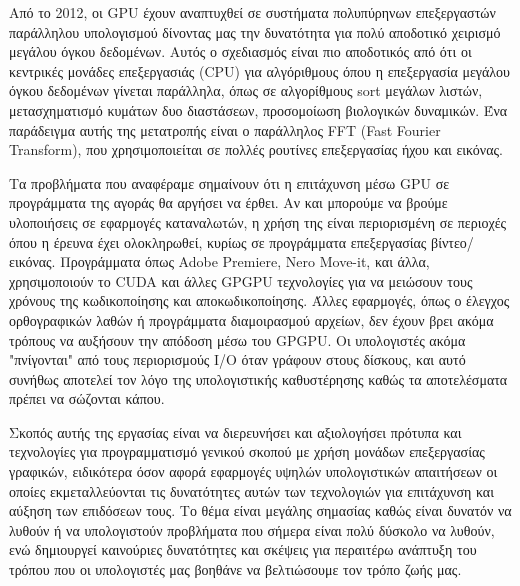 Από το 2012, οι GPU έχουν αναπτυχθεί σε συστήματα πολυπύρηνων επεξεργαστών παράλληλου υπολογισμού δίνοντας μας την δυνατότητα για πολύ αποδοτικό χειρισμό μεγάλου όγκου δεδομένων. Αυτός ο σχεδιασμός είναι πιο αποδοτικός από ότι οι κεντρικές μονάδες επεξεργασιάς (CPU) για αλγόριθμους όπου η επεξεργασία μεγάλου όγκου δεδομένων γίνεται παράλληλα, όπως σε αλγορίθμους sort μεγάλων λιστών, μετασχηματισμό κυμάτων δυο διαστάσεων, προσομοίωση βιολογικών δυναμικών. Ένα παράδειγμα αυτής της μετατροπής είναι ο παράλληλος FFT (Fast Fourier Transform), που χρησιμοποιείται σε πολλές ρουτίνες επεξεργασίας ήχου και εικόνας.

Τα προβλήματα που αναφέραμε σημαίνουν ότι η επιτάχυνση μέσω GPU σε προγράμματα της αγοράς θα αργήσει να έρθει. Αν και μπορούμε να βρούμε υλοποιήσεις σε εφαρμογές καταναλωτών, η χρήση της είναι περιορισμένη σε περιοχές όπου η έρευνα έχει ολοκληρωθεί, κυρίως σε προγράμματα επεξεργασίας βίντεο/εικόνας. Προγράμματα όπως Adobe Premiere, Nero Move-it, και άλλα, χρησιμοποιούν το CUDA και άλλες GPGPU τεχνολογίες για να μειώσουν τους χρόνους της κωδικοποίησης και αποκωδικοποίησης. Άλλες εφαρμογές, όπως ο έλεγχος ορθογραφικών λαθών ή προγράμματα διαμοιρασμού αρχείων, δεν έχουν βρει ακόμα τρόπους να αυξήσουν την απόδοση μέσω του GPGPU. Οι υπολογιστές ακόμα "πνίγονται" από τους περιορισμούς I/O όταν γράφουν στους δίσκους, και αυτό συνήθως αποτελεί τον λόγο της υπολογιστικής καθυστέρησης καθώς τα αποτελέσματα πρέπει να σώζονται κάπου.\cite{gpgpu-2}

Σκοπός αυτής της εργασίας είναι να διερευνήσει και αξιολογήσει πρότυπα και τεχνολογίες για προγραμματισμό γενικού σκοπού με χρήση μονάδων επεξεργασίας γραφικών, ειδικότερα όσον αφορά εφαρμογές υψηλών υπολογιστικών απαιτήσεων οι οποίες εκμεταλλεύονται τις δυνατότητες αυτών των τεχνολογιών για επιτάχυνση και αύξηση των επιδόσεων τους. Το θέμα είναι μεγάλης σημασίας καθώς είναι δυνατόν να λυθούν ή να υπολογιστούν προβλήματα που σήμερα είναι πολύ δύσκολο να λυθούν, ενώ δημιουργεί καινούριες δυνατότητες και σκέψεις για περαιτέρω ανάπτυξη του τρόπου που οι υπολογιστές μας βοηθάνε να βελτιώσουμε τον τρόπο ζωής μας.